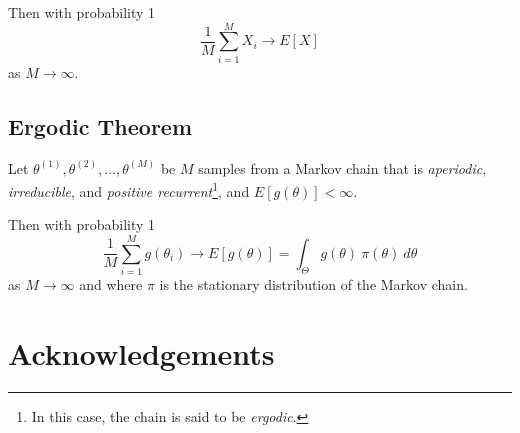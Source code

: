 \documentclass[11pt, oneside]{article}   	%
\begin{document}
\bigskip
\noindent
Then with probability 1
\begin{equation}
\frac{1}{M}\sum\limits_{i=1}^{M} X_i \rightarrow E[X]
\end{equation}
as  $M \rightarrow \infty$.

\subsection{Ergodic Theorem}
\label{sec:ergodic}
Let $\theta^{(1)}, \theta^{(2)}, \hdots, \theta^{(M)}$ be $M$ samples from a Markov chain that is \emph{aperiodic}, \emph{irreducible}, and \emph{positive recurrent}\footnote{In this case, the chain is said to be \emph{ergodic}.}, and $E[g(\theta)] < \infty$.

\bigskip
\noindent
Then with probability 1
\begin{equation}
\frac{1}{M}\sum\limits_{i = 1}^{M} g(\theta_{i}) \rightarrow E[g(\theta)]  = \int_{\Theta}^{}g(\theta) \: \pi(\theta) \:d\theta
\end{equation}
as $M \rightarrow \infty$ and where $\pi$ is the stationary distribution of the Markov chain.

\section{Acknowledgements}

\newpage


\end{document}
